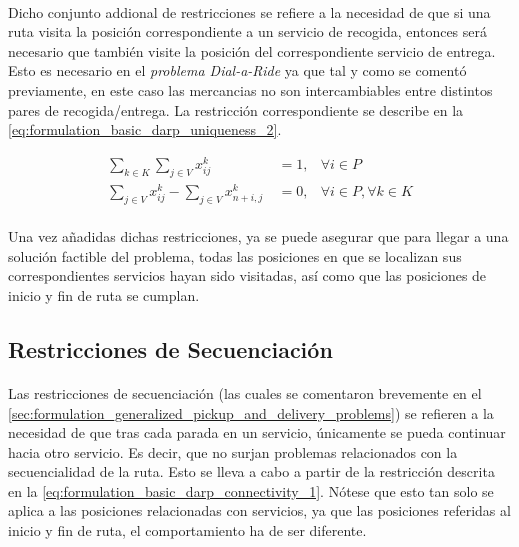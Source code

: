 \documentclass{subfiles}
\begin{document}
        \paragraph{}
        Dicho conjunto addional de restricciones se refiere a la necesidad de que si una ruta visita la posición correspondiente a un servicio de recogida, entonces será necesario que también visite la posición del correspondiente servicio de entrega. Esto es necesario en el \emph{problema Dial-a-Ride} ya que tal y como se comentó previamente, en este caso las mercancias no son intercambiables entre distintos pares de recogida/entrega. La restricción correspondiente se describe en la \cref{eq:formulation_basic_darp_uniqueness_2}.

        \begin{align}
        \label{eq:formulation_basic_darp_uniqueness_1}
          \displaystyle\sum\limits_{k \in K}\sum\limits_{j \in V} x_{ij}^{k} \ &= 1, & \forall i \in P \\
        \label{eq:formulation_basic_darp_uniqueness_2}
          \displaystyle\sum\limits_{j \in V} x_{ij}^{k} - \sum\limits_{j \in V} x_{n+i,j}^{k} \ &= 0, & \forall i \in P, \forall k \in K
        \end{align}

        \paragraph{}
        Una vez añadidas dichas restricciones, ya se puede asegurar que para llegar a una solución factible del problema, todas las posiciones en que se localizan sus correspondientes servicios hayan sido visitadas, así como que las posiciones de inicio y fin de ruta se cumplan.

      \subsection{Restricciones de Secuenciación}
      \label{sec:formulation_basic_darp_connectivity}

        \paragraph{}
        Las restricciones de secuenciación (las cuales se comentaron brevemente en el \cref{sec:formulation_generalized_pickup_and_delivery_problems}) se refieren a la necesidad de que tras cada parada en un servicio, únicamente se pueda continuar hacia otro servicio. Es decir, que no surjan problemas relacionados con la secuencialidad de la ruta. Esto se lleva a cabo a partir de la restricción descrita en la \cref{eq:formulation_basic_darp_connectivity_1}. Nótese que esto tan solo se aplica a las posiciones relacionadas con servicios, ya que las posiciones referidas al inicio y fin de ruta, el comportamiento ha de ser diferente.
\end{document}
